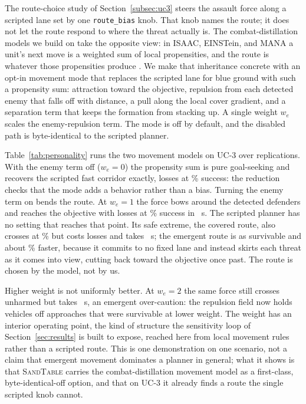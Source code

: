 \documentclass[11pt]{article}
\newcommand{\sandtable}{\textsc{SandTable}}
\begin{document}
The route-choice study of Section~\ref{subsec:uc3} steers the assault force along a scripted lane set by one \texttt{route\_bias} knob. That knob names the route; it does not let the route respond to where the threat actually is. The combat-distillation models we build on take the opposite view: in ISAAC, EINSTein, and MANA a unit's next move is a weighted sum of local propensities, and the route is whatever those propensities produce \citep{ilachinski2000isaac,ilachinski2004artificial,lauren2002mana}. We make that inheritance concrete with an opt-in movement mode that replaces the scripted lane for blue ground with such a propensity sum: attraction toward the objective, repulsion from each detected enemy that falls off with distance, a pull along the local cover gradient, and a separation term that keeps the formation from stacking up. A single weight $w_e$ scales the enemy-repulsion term. The mode is off by default, and the disabled path is byte-identical to the scripted planner.

Table~\ref{tab:personality} runs the two movement models on UC-3 over \personalityNRep{} replications. With the enemy term off ($w_e{=}0$) the propensity sum is pure goal-seeking and recovers the scripted fast corridor exactly, \persStraightLoss{} losses at \persStraightSucc\% success: the reduction checks that the mode adds a behavior rather than a bias. Turning the enemy term on bends the route. At $w_e{=}1$ the force bows around the detected defenders and reaches the objective with \persAvoidLoss{} losses at \persAvoidSucc\% success in \persAvoidTime{}~s. The scripted planner has no setting that reaches that point. Its safe extreme, the covered route, also crosses at \persScriptCoverSucc\% but costs \persScriptCoverLoss{} losses and takes \persScriptCoverTime{}~s; the emergent route is as survivable and about \persTimeSavePct\% faster, because it commits to no fixed lane and instead skirts each threat as it comes into view, cutting back toward the objective once past. The route is chosen by the model, not by us.

Higher weight is not uniformly better. At $w_e{=}2$ the same force still crosses unharmed but takes \persOverTime{}~s, an emergent over-caution: the repulsion field now holds vehicles off approaches that were survivable at lower weight. The weight has an interior operating point, the kind of structure the sensitivity loop of Section~\ref{sec:results} is built to expose, reached here from local movement rules rather than a scripted route. This is one demonstration on one scenario, not a claim that emergent movement dominates a planner in general; what it shows is that \sandtable{} carries the combat-distillation movement model as a first-class, byte-identical-off option, and that on UC-3 it already finds a route the single scripted knob cannot.
\end{document}
